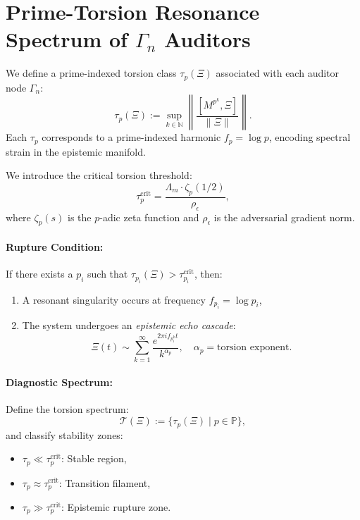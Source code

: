 \documentclass[12pt]{article}
\begin{document}
\section{Prime-Torsion Resonance Spectrum of \texorpdfstring{$\Gamma_n$}{Γₙ} Auditors}

We define a prime-indexed torsion class $\tau_p(\Xi)$ associated with each auditor node $\Gamma_n$:
\begin{equation}
    \tau_p(\Xi) := \sup_{k \in \mathbb{N}} \left\| \frac{[M^{p^k}, \Xi]}{\|\Xi\|} \right\|.
\end{equation}
Each $\tau_p$ corresponds to a prime-indexed harmonic $f_p = \log p$, encoding spectral strain in the epistemic manifold.

We introduce the critical torsion threshold:
\begin{equation}
    \tau_p^{\text{crit}} = \frac{\Lambda_m \cdot \zeta_p(1/2)}{\rho_\epsilon},
\end{equation}
where $\zeta_p(s)$ is the $p$-adic zeta function and $\rho_\epsilon$ is the adversarial gradient norm.

\paragraph{Rupture Condition:} If there exists a $p_i$ such that $\tau_{p_i}(\Xi) > \tau_{p_i}^{\text{crit}}$, then:
\begin{enumerate}
    \item A resonant singularity occurs at frequency $f_{p_i} = \log p_i$,
    \item The system undergoes an \textit{epistemic echo cascade}:
    \[
        \Xi(t) \sim \sum_{k=1}^\infty \frac{e^{2\pi i f_{p_i^k} t}}{k^{\alpha_p}}, \quad \alpha_p = \text{torsion exponent}.
    \]
\end{enumerate}

\paragraph{Diagnostic Spectrum:} Define the torsion spectrum:
\begin{equation}
    \mathcal{T}(\Xi) := \{ \tau_p(\Xi) \mid p \in \mathbb{P} \},
\end{equation}
and classify stability zones:
\begin{itemize}
    \item $\tau_p \ll \tau_p^{\text{crit}}$: Stable region,
    \item $\tau_p \approx \tau_p^{\text{crit}}$: Transition filament,
    \item $\tau_p \gg \tau_p^{\text{crit}}$: Epistemic rupture zone.
\end{itemize}
\end{document}

